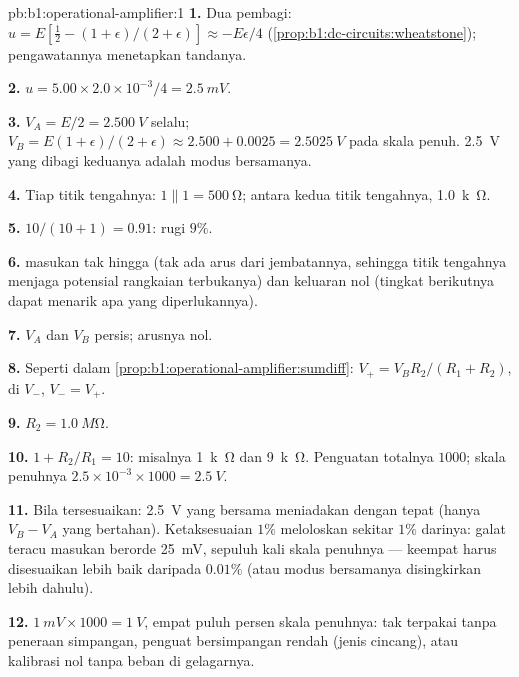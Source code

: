 \begin{solution}{pb:b1:operational-amplifier:1}
\textbf{1.} Dua pembagi: $u = E[\tfrac12 - (1 + \epsilon)/(2 + \epsilon)]
\approx -E\epsilon/4$ (\cref{prop:b1:dc-circuits:wheatstone});
pengawatannya menetapkan tandanya.

\textbf{2.} $u = 5.00 \times 2.0\times10^{-3}/4 = \qty{2.5}{mV}$.

\textbf{3.} $V_A = E/2 = \qty{2.500}{V}$ selalu; $V_B = E(1 + \epsilon)/(2 +
\epsilon) \approx 2.500 + 0.0025 = \qty{2.5025}{V}$ pada skala penuh.
\qty{2.5}{V} yang dibagi keduanya adalah  modus bersamanya.

\textbf{4.} Tiap titik tengahnya: $1 \parallel 1 = \qty{500}{\ohm}$; antara
kedua titik tengahnya, \qty{1.0}{k\ohm}.

\textbf{5.} $10/(10 + 1) = 0.91$: rugi $9\%$.

\textbf{6.}  masukan tak hingga (tak ada arus dari jembatannya,
sehingga titik tengahnya menjaga potensial rangkaian terbukanya) dan
 keluaran nol (tingkat berikutnya dapat menarik apa yang diperlukannya).

\textbf{7.} $V_A$ dan $V_B$ persis; arusnya nol.

\textbf{8.} Seperti dalam \cref{prop:b1:operational-amplifier:sumdiff}: $V_+ =
V_BR_2/(R_1 + R_2)$,  di $V_-$, $V_- = V_+$.

\textbf{9.} $R_2 = \qty{1.0}{M\ohm}$.

\textbf{10.} $1 + R_2/R_1 = 10$: misalnya \qty{1}{k\ohm} dan \qty{9}{k\ohm}.
Penguatan totalnya $1000$; skala penuhnya $2.5 \times 10^{-3} \times 1000 = \qty{2.5}{V}$.

\textbf{11.} Bila tersesuaikan: \qty{2.5}{V} yang bersama meniadakan
dengan tepat (hanya $V_B - V_A$ yang bertahan). Ketaksesuaian $1\%$
meloloskan sekitar $1\%$ darinya: galat teracu masukan berorde
\qty{25}{mV}, sepuluh kali  skala penuhnya --- keempat 
harus disesuaikan lebih baik daripada $0.01\%$ (atau  modus
bersamanya disingkirkan lebih dahulu).

\textbf{12.} $1\ \unit{mV} \times 1000 = \qty{1}{V}$, empat puluh persen skala
penuhnya: tak terpakai tanpa peneraan simpangan, penguat bersimpangan
rendah (jenis cincang), atau kalibrasi nol tanpa beban di gelagarnya.


\end{solution}
